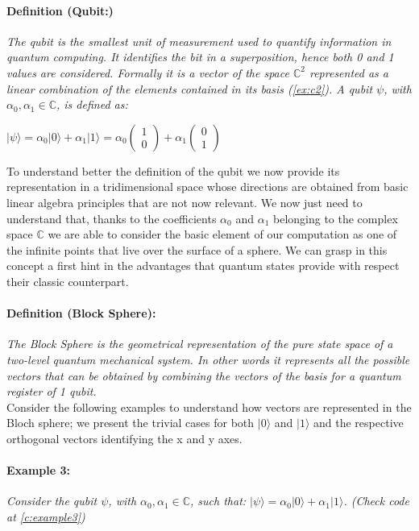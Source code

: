 \documentclass[english]{article}
\newcommand{\zeroket}{\begin{pmatrix} 1 \\ 0 \end{pmatrix}}
\newcommand{\oneket}{\begin{pmatrix} 0 \\ 1 \end{pmatrix}}
\begin{document}
				\paragraph{Definition (Qubit:)} \emph{The qubit is the smallest unit of measurement used to quantify information in quantum computing. It identifies the bit in a superposition, hence both 0 and 1 values are considered. Formally it is a vector of the space $\mathbb{C}^{2}$ represented as a linear combination of the elements contained in its basis (\ref{ex:c2}). A qubit $\psi$, with $\alpha_0,\alpha_1\in\mathbb{C}$, is defined as:}\\
				\begin{center}
					$
					|\psi\rangle = \alpha_0 |0\rangle + \alpha_1 |1\rangle = \alpha_0\zeroket + \alpha_1\oneket
					$
				\end{center}
				
				To understand better the definition of the qubit we now provide its representation in a tridimensional space whose directions are obtained from basic linear algebra principles that are not now relevant. We now just need to understand that, thanks to the coefficients $\alpha_0$ and $\alpha_1$ belonging to the complex space $\mathbb{C}$ we are able to consider the basic element of our computation as one of the infinite points that live over the surface of a sphere. We can grasp in this concept a first hint in the advantages that quantum states provide with respect their classic counterpart.
				
				\paragraph{Definition (Block Sphere):} \emph{The Block Sphere is the geometrical representation of the pure state space of a two-level quantum mechanical system. In other words it represents all the possible vectors that can be obtained by combining the vectors of the basis for a quantum register of 1 qubit.}\\
				
				Consider the following examples to understand how vectors are represented in the Bloch sphere; we present the trivial cases for both $|0\rangle$ and $|1\rangle$ and the respective orthogonal vectors identifying the x and y axes.
	
				\paragraph{Example 3:} \emph{Consider the qubit $\psi$, with $\alpha_0,\alpha_1\in\mathbb{C}$, such that: 	$|\psi\rangle = \alpha_0 |0\rangle + \alpha_1 |1\rangle$. (Check code at \ref{c:example3})}
				
\end{document}
